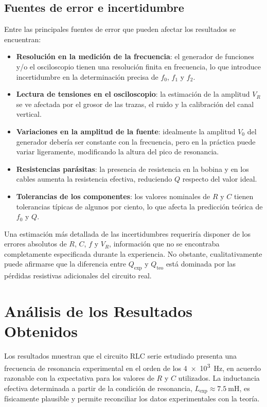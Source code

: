 \documentclass[a4paper,12pt]{article}
\begin{document}
\subsection{Fuentes de error e incertidumbre}
Entre las principales fuentes de error que pueden afectar los resultados se encuentran:
\begin{itemize}
    \item \textbf{Resolución en la medición de la frecuencia}: el generador de funciones y/o el osciloscopio tienen una resolución finita en frecuencia, lo que introduce incertidumbre en la determinación precisa de \( f_0 \), \( f_1 \) y \( f_2 \).
    \item \textbf{Lectura de tensiones en el osciloscopio}: la estimación de la amplitud \( V_R \) se ve afectada por el grosor de las trazas, el ruido y la calibración del canal vertical.
    \item \textbf{Variaciones en la amplitud de la fuente}: idealmente la amplitud \( V_0 \) del generador debería ser constante con la frecuencia, pero en la práctica puede variar ligeramente, modificando la altura del pico de resonancia.
    \item \textbf{Resistencias parásitas}: la presencia de resistencia en la bobina y en los cables aumenta la resistencia efectiva, reduciendo \( Q \) respecto del valor ideal.
    \item \textbf{Tolerancias de los componentes}: los valores nominales de \( R \) y \( C \) tienen tolerancias típicas de algunos por ciento, lo que afecta la predicción teórica de \( f_0 \) y \( Q \).
\end{itemize}

Una estimación más detallada de las incertidumbres requeriría disponer de los errores absolutos de \( R \), \( C \), \( f \) y \( V_R \), información que no se encontraba completamente especificada durante la experiencia. No obstante, cualitativamente puede afirmarse que la diferencia entre \( Q_{\text{exp}} \) y \( Q_{\text{teo}} \) está dominada por las pérdidas resistivas adicionales del circuito real.

\section{Análisis de los Resultados Obtenidos}
Los resultados muestran que el circuito RLC serie estudiado presenta una frecuencia de resonancia experimental en el orden de los \SI{4e3}{\hertz}, en acuerdo razonable con la expectativa para los valores de \( R \) y \( C \) utilizados. La inductancia efectiva determinada a partir de la condición de resonancia, \( L_{\text{exp}} \approx \SI{7.5}{\milli\henry} \), es físicamente plausible y permite reconciliar los datos experimentales con la teoría.
\end{document}
